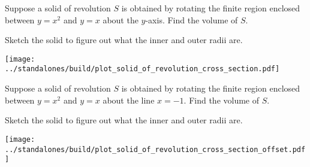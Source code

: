 \documentclass[../main.tex]{subfiles}
\begin{document}
  \begin{example}
    Suppose a solid of revolution \(S\) is obtained by rotating the finite region enclosed between \(y = x^{2}\) and \(y = x\) about the \(y\)-axis.  Find the volume of \(S\).


    Sketch the solid to figure out what the inner and outer radii are.

    \begin{center}
      \texttt{[image: ../standalones/build/plot\_solid\_of\_revolution\_cross\_section.pdf]}
    \end{center}
  \end{example}
  \clearpage

  \begin{example}
    Suppose a solid of revolution \(S\) is obtained by rotating the finite region enclosed between \(y = x^{2}\) and \(y = x\) about the line \(x = -1\).  Find the volume of \(S\).

    Sketch the solid to figure out what the inner and outer radii are.

    \begin{center}
      \hspace{2in}\texttt{[image: ../standalones/build/plot\_solid\_of\_revolution\_cross\_section\_offset.pdf]}
    \end{center}
  \end{example}
\end{document}
